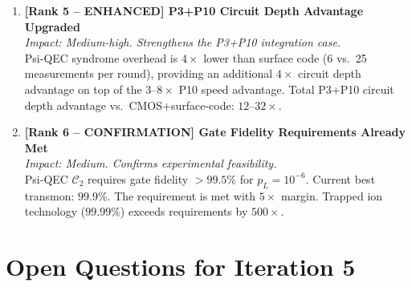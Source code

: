 \documentclass[11pt]{article}
\theoremstyle{definition}
\theoremstyle{remark}
\begin{document}
\begin{enumerate}
\item \textbf{[Rank 5 -- ENHANCED] P3+P10 Circuit Depth Advantage Upgraded}\\
  \textit{Impact: Medium-high.  Strengthens the P3+P10 integration case.}\\
  Psi-QEC syndrome overhead is $4\times$ lower than surface code (6 vs.\ 25
  measurements per round), providing an additional $4\times$ circuit depth
  advantage on top of the $3\text{--}8\times$ P10 speed advantage.
  Total P3+P10 circuit depth advantage vs.\ CMOS+surface-code: $12\text{--}32\times$.

\item \textbf{[Rank 6 -- CONFIRMATION] Gate Fidelity Requirements Already Met}\\
  \textit{Impact: Medium.  Confirms experimental feasibility.}\\
  Psi-QEC $\mathcal{C}_2$ requires gate fidelity $> 99.5\%$ for $p_L = 10^{-6}$.
  Current best transmon: $99.9\%$.  The requirement is met with $5\times$ margin.
  Trapped ion technology ($99.99\%$) exceeds requirements by $500\times$.

\end{enumerate}

\section{Open Questions for Iteration 5}
\label{sec:open-questions}
\end{document}
